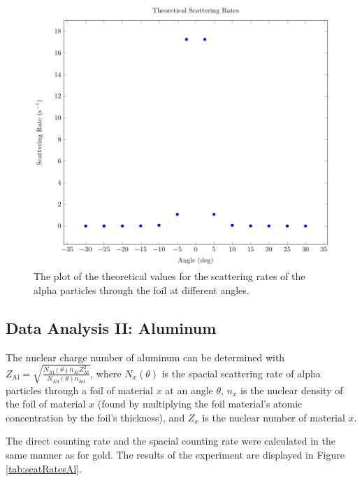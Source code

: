 \documentclass[a4paper]{article}
\begin{document}
\begin{figure}[H]
  \begin{center}
    \includegraphics[scale=0.8]{Plots/TheoreticalScatteringRates/theoScatRates.pdf}
  \end{center}
  \caption{The plot of the theoretical values for the scattering rates of the
    alpha particles through the foil at different angles.}
  \label{gph:theoScatRatesGold}
\end{figure}

\subsection{Data Analysis II: Aluminum}

\qq The nuclear charge number of aluminum can be determined with \\
\( Z_{\text{Al}} = \sqrt{\frac{N_{\text{Al}} (\theta) n_{\text{Al}}
    Z^2_{\text{Al}}}{N_{\text{Au}} (\theta) n_{\text{Au}}}} \), where
\( N_x (\theta) \) is the spacial scattering rate of alpha particles through a
foil of material \( x \) at an angle \( \theta \), \( n_x \) is the nuclear
density of the foil of material \( x \) (found by multiplying the foil
material's atomic concentration by the foil's thickness), and \( Z_x \) is the
nuclear number of material \( x \).

\qq The direct counting rate and the spacial counting rate were calculated in
the same manner as for gold. The results of the experiment are displayed in
Figure \ref{tab:scatRatesAl}.
\end{document}
